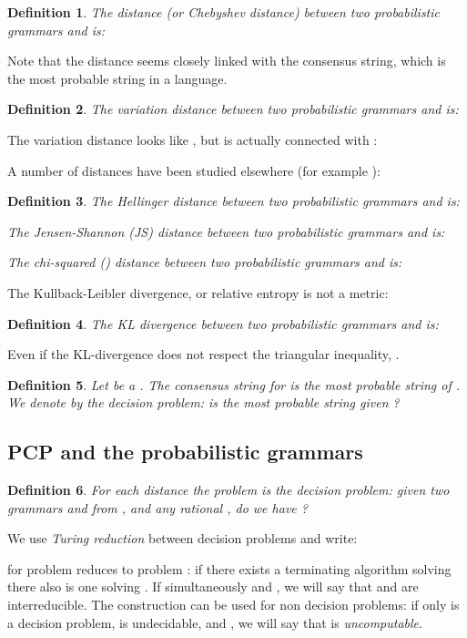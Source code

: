 \documentclass[submission]{eptcs} \usepackage{breakurl}             \usepackage[english]{babel}
\newtheorem{definition}{Definition}
\begin{document}
\begin{definition}
The  distance (or Chebyshev distance) between two probabilistic grammars  and  is:

\end{definition}
Note that the  distance seems closely linked with the consensus string, which is the most probable string in a language.
\begin{definition}
The \emph{variation distance} between two probabilistic grammars  and  is:

\end{definition}
The variation distance looks like , but is actually connected with :


A number of distances have been studied elsewhere (for example \cite{jago01,cort07}):
\begin{definition}
The \emph{Hellinger distance} between two probabilistic grammars  and  is:


The \emph{Jensen-Shannon (JS)} distance between two probabilistic grammars  and  is:


The \emph{chi-squared ()} distance between two probabilistic grammars  and  is:

\end{definition}


The Kullback-Leibler divergence, or relative entropy is not a metric:
\begin{definition}
The KL divergence between two probabilistic grammars  and  is:

\end{definition}
Even if the KL-divergence does not respect the triangular inequality, .
\begin{definition}
Let  be a . The consensus string for  is the most probable string of .
We denote by  the decision problem: is  the most probable string given ?
\end{definition}


\subsection{PCP and the probabilistic grammars}
\begin{definition}
For each distance   the problem  is the decision problem: given two grammars  and  from , and any rational , do we have ?
\end{definition}
We  use \emph{Turing reduction} between decision problems and write:

for problem  reduces to problem : if there exists a terminating algorithm solving  there also is one solving . If simultaneously  and , we will say that  and  are interreducible. The construction can be used for non decision problems: if only  is a decision problem,  is undecidable, and ,  we will say that  is \emph{uncomputable}.
\end{document}
